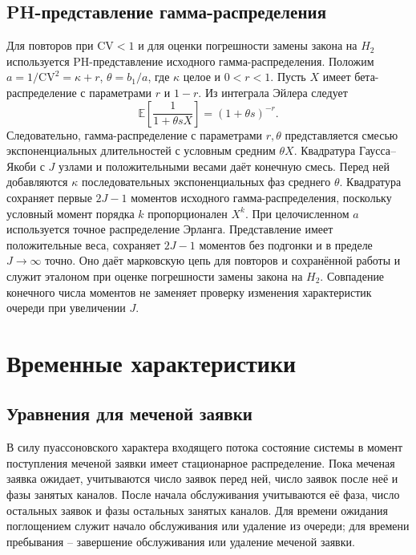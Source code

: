 \subsection{PH-представление гамма-распределения}
Для повторов при \(\mathrm{CV}<1\) и для оценки погрешности замены закона на \(H_2\) используется PH-представление исходного гамма-распределения. Положим \(a=1/\mathrm{CV}^2=\kappa+r\), \(\theta=b_1/a\), где \(\kappa\) целое и \(0<r<1\). Пусть \(X\) имеет бета-распределение с параметрами \(r\) и \(1-r\). Из интеграла Эйлера \cite{nistdlmf} следует
\[
\mathbb E\!\left[\frac{1}{1+\theta sX}\right]=(1+\theta s)^{-r}.
\]
Следовательно, гамма-распределение с параметрами \(r,\theta\) представляется смесью экспоненциальных длительностей с условным средним \(\theta X\). Квадратура Гаусса--Якоби с \(J\) узлами и положительными весами даёт конечную смесь. Перед ней добавляются \(\kappa\) последовательных экспоненциальных фаз среднего \(\theta\). Квадратура сохраняет первые \(2J-1\) моментов исходного гамма-распределения, поскольку условный момент порядка \(k\) пропорционален \(X^k\). При целочисленном \(a\) используется точное распределение Эрланга. Представление имеет положительные веса, сохраняет \(2J-1\) моментов без подгонки и в пределе \(J\to\infty\) точно. Оно даёт марковскую цепь для повторов и сохранённой работы и служит эталоном при оценке погрешности замены закона на \(H_2\). Совпадение конечного числа моментов не заменяет проверку изменения характеристик очереди при увеличении \(J\).


\section{Временные характеристики}\label{sec:times}
\subsection{Уравнения для меченой заявки}
В силу пуассоновского характера входящего потока состояние системы в момент поступления меченой заявки имеет стационарное распределение. Пока меченая заявка ожидает, учитываются число заявок перед ней, число заявок после неё и фазы занятых каналов. После начала обслуживания учитываются её фаза, число остальных заявок и фазы остальных занятых каналов. Для времени ожидания поглощением служит начало обслуживания или удаление из очереди; для времени пребывания -- завершение обслуживания или удаление меченой заявки.

